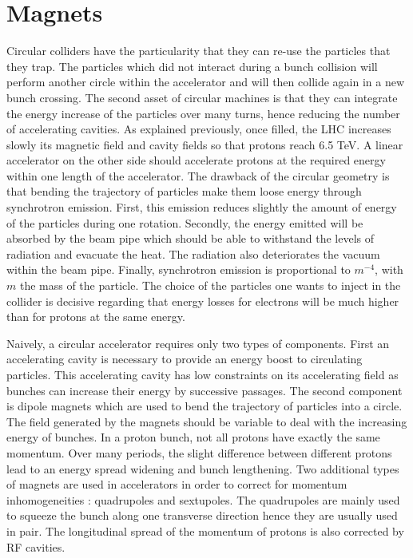 \section{Magnets}
\label{sec:orgb3bba33}
Circular colliders have the particularity that they can re-use the particles that they trap.
The particles which did not interact during a bunch collision will perform another circle within the accelerator and will then collide again in a new bunch crossing.
The second asset of circular machines is that they can integrate the energy increase of the particles over many turns, hence reducing the number of accelerating cavities.
As explained previously, once filled, the LHC increases slowly its magnetic field and cavity fields so that protons reach 6.5 TeV.
A linear accelerator on the other side should accelerate protons at the required energy within one length of the accelerator.
The drawback of the circular geometry is that bending the trajectory of particles make them loose energy through synchrotron emission.
First, this emission reduces slightly the amount of energy of the particles during one rotation.
Secondly, the energy emitted will be absorbed by the beam pipe which should be able to withstand the levels of radiation and evacuate the heat.
The radiation also deteriorates the vacuum within the beam pipe.
Finally, synchrotron emission is proportional to \(m^{-4}\), with $m$ the mass of the particle.
The choice of the particles one wants to inject in the collider is decisive regarding that energy losses for electrons will be much higher than for protons at the same energy.


Naively, a circular accelerator requires only two types of components.
First an accelerating cavity is necessary to provide an energy boost to circulating particles.
This accelerating cavity has low constraints on its accelerating field as bunches can increase their energy by successive passages.
The second component is dipole magnets which are used to bend the trajectory of particles into a circle.
The field generated by the magnets should be variable to deal with the increasing energy of bunches.
In a proton bunch, not all protons have exactly the same momentum.
Over many periods, the slight difference between different protons lead to an energy spread widening and bunch lengthening.
Two additional types of magnets are used in accelerators in order to correct for momentum inhomogeneities : quadrupoles and sextupoles.
The quadrupoles are mainly used to squeeze the bunch along one transverse direction hence they are usually used in pair.
The longitudinal spread of the momentum of protons is also corrected by RF cavities.


